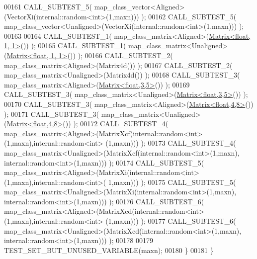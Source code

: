 \begin{DoxyCode}
00161     CALL\_SUBTEST\_5( map\_class\_vector<Aligned>(VectorXi(internal::random<int>(1,maxn))) );
00162     CALL\_SUBTEST\_5( map\_class\_vector<Unaligned>(VectorXi(internal::random<int>(1,maxn))) );
00163 
00164     CALL\_SUBTEST\_1( map\_class\_matrix<Aligned>(\hyperlink{group___core___module_class_eigen_1_1_matrix}{Matrix<float, 1, 1>}()) );
00165     CALL\_SUBTEST\_1( map\_class\_matrix<Unaligned>(\hyperlink{group___core___module_class_eigen_1_1_matrix}{Matrix<float, 1, 1>}()) );
00166     CALL\_SUBTEST\_2( map\_class\_matrix<Aligned>(Matrix4d()) );
00167     CALL\_SUBTEST\_2( map\_class\_matrix<Unaligned>(Matrix4d()) );
00168     CALL\_SUBTEST\_3( map\_class\_matrix<Aligned>(\hyperlink{group___core___module_class_eigen_1_1_matrix}{Matrix<float,3,5>}()) );
00169     CALL\_SUBTEST\_3( map\_class\_matrix<Unaligned>(\hyperlink{group___core___module_class_eigen_1_1_matrix}{Matrix<float,3,5>}()) );
00170     CALL\_SUBTEST\_3( map\_class\_matrix<Aligned>(\hyperlink{group___core___module_class_eigen_1_1_matrix}{Matrix<float,4,8>}()) );
00171     CALL\_SUBTEST\_3( map\_class\_matrix<Unaligned>(\hyperlink{group___core___module_class_eigen_1_1_matrix}{Matrix<float,4,8>}()) );
00172     CALL\_SUBTEST\_4( map\_class\_matrix<Aligned>(MatrixXcf(internal::random<int>(1,maxn),internal::random<int>
      (1,maxn))) );
00173     CALL\_SUBTEST\_4( map\_class\_matrix<Unaligned>(MatrixXcf(internal::random<int>(1,maxn),
      internal::random<int>(1,maxn))) );
00174     CALL\_SUBTEST\_5( map\_class\_matrix<Aligned>(MatrixXi(internal::random<int>(1,maxn),internal::random<int>(
      1,maxn))) );
00175     CALL\_SUBTEST\_5( map\_class\_matrix<Unaligned>(MatrixXi(internal::random<int>(1,maxn),
      internal::random<int>(1,maxn))) );
00176     CALL\_SUBTEST\_6( map\_class\_matrix<Aligned>(MatrixXcd(internal::random<int>(1,maxn),internal::random<int>
      (1,maxn))) );
00177     CALL\_SUBTEST\_6( map\_class\_matrix<Unaligned>(MatrixXcd(internal::random<int>(1,maxn),
      internal::random<int>(1,maxn))) );
00178     
00179     TEST\_SET\_BUT\_UNUSED\_VARIABLE(maxn);
00180   \}
00181 \}
\end{DoxyCode}
